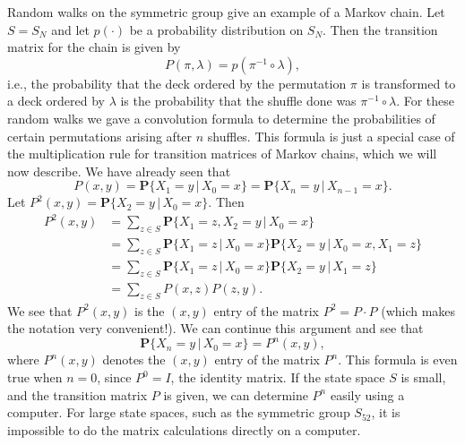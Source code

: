 \documentclass{stml-l}
\theoremstyle{definition}
\numberwithin{equation}{chapter}
\numberwithin{figure}{chapter}
\numberwithin{figure}{section}
\begin{document}
Random walks on the symmetric group give an example of a Markov
chain. Let $S=S_{N}$ and let $p(\cdot)$ be a probability
distribution on $S_{N}$. Then the transition matrix for the chain is
given by
\begin{equation*}
P(\pi,\lambda)=p(\pi^{-1}\circ\lambda),
\end{equation*}
i.e., the probability that the deck ordered by the permutation $\pi$
is transformed to a deck ordered by $\lambda$ is the probability
that the shuffle done was $\pi^{-1}\circ \lambda$. For these random
walks we gave a convolution formula to determine the probabilities
of certain permutations arising after $n$ shuffles. This formula is
just a special case of the multiplication rule for transition
matrices of Markov chains, which we will now describe. We have
already seen that
\begin{equation*}
P(x,y)=\mathbf{P}\{X_{1}=y\,|\,X_{0}=x\}=\mathbf{P}\{X_{n}=y\,|\,X_{n-1}=x\}.
\end{equation*}
Let $P^{2}(x,y)=\mathbf{P}\{X_{2}=y\,|\,X_{0}=x\}$. Then
\begin{align*}
P^{2}(x,y) &= \sum\limits_{z\in
S}\mathbf{P}\{X_{1}=z,X_{2}=y\,|\,X_{0}=x\}\\
&= \sum\limits_{z\in
S}\mathbf{P}\{X_{1}=z\,|\,X_{0}=x\}\mathbf{P}\{X_{2}=y\,|\,X_{0}=x,X_{1}=z\}\\
&=\sum\limits_{z\in
S}\mathbf{P}\{X_{1}=z\,|\,X_{0}=x\}\mathbf{P}\{X_{2}=y\,|\,X_{1}=z\}\\
&= \sum\limits_{z\in S}P(x,z)P(z,y).
\end{align*}
We see that $P^{2}(x,y)$ is the $(x,y)$ entry of the matrix
$P^{2}=P\cdot P$ (which makes the notation very convenient!). We can
continue this argument and see that
\begin{equation*}
\mathbf{P}\{X_{n}=y\,|\,X_{0}=x\}=P^{n}(x,y),
\end{equation*}
where $P^{n}(x,y)$ denotes the $(x,y)$ entry of the matrix $P^{n}$.
This formula is even true when $n=0$, since $P^{0}=I$, the identity
matrix. If the state space $S$ is small, and the transition matrix
$P$ is given, we can determine $P^{n}$ easily using a computer. For
large state spaces, such as the symmetric group $S_{52}$, it is
impossible to do the matrix calculations directly on a computer.
\end{document}
